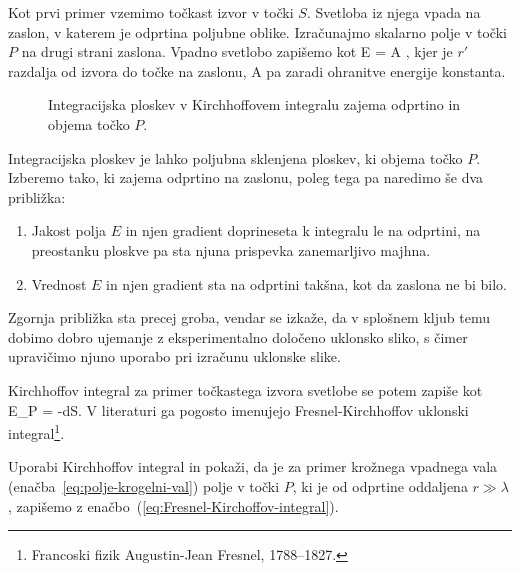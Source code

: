 Kot prvi primer vzemimo točkast izvor v točki $S$. Svetloba iz njega vpada na zaslon, 
v katerem je odprtina poljubne oblike. Izračunajmo skalarno polje v točki $P$ na drugi 
strani zaslona. Vpadno svetlobo zapišemo kot
\beq
\label{eq:polje-krogelni-val}
E = A ,
\eeq
kjer je $r'$ razdalja od izvora do točke na zaslonu, A pa zaradi ohranitve energije konstanta.

\begin{figure}[h]
\centering {} 
  
\caption{Integracijska ploskev v Kirchhoffovem integralu zajema odprtino in objema točko $P$.}
\label{fig:UklonFK}
\end{figure}


Integracijska ploskev je lahko poljubna sklenjena ploskev, ki objema točko $P$. Izberemo tako, ki
zajema odprtino na zaslonu, poleg tega pa naredimo še dva približka:\\
\begin{enumerate}
\item Jakost polja $E$ in njen gradient doprineseta k integralu le na odprtini, na preostanku ploskve
pa sta njuna prispevka zanemarljivo majhna.\\
\item Vrednost $E$ in njen gradient sta na odprtini takšna, kot da zaslona ne bi bilo.\\
\end{enumerate}
Zgornja približka sta precej groba, vendar se izkaže, da v splošnem kljub temu
dobimo dobro ujemanje z eksperimentalno določeno uklonsko sliko, s čimer 
upravičimo njuno uporabo pri izračunu uklonske slike.

Kirchhoffov integral za primer točkastega izvora svetlobe se potem zapiše kot
\beq
E_P = -\int{} dS.
\label{eq:Fresnel-Kirchoffov-integral}
\eeq
V literaturi ga pogosto imenujejo Fresnel-Kirchhoffov uklonski integral\footnote{Francoski fizik
Augustin-Jean Fresnel, 1788--1827.}.
\begin{definition}
\label{naloga-Fresnel-Kirchhoff-uklon}
Uporabi Kirchhoffov integral in pokaži, da je za primer krožnega vpadnega vala
(enačba~\ref{eq:polje-krogelni-val}) polje v točki $P$, ki je od odprtine oddaljena 
$r \gg \lambda$, zapišemo z enačbo~(\ref{eq:Fresnel-Kirchoffov-integral}).
\end{definition}


